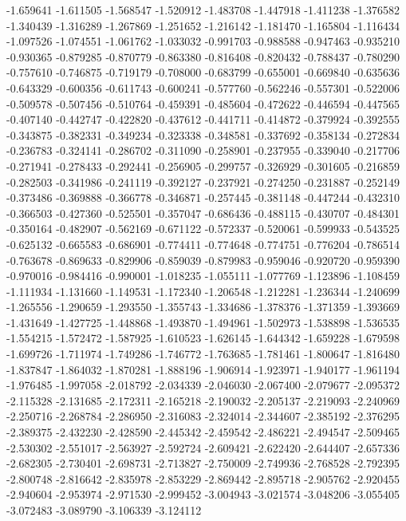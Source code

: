 -1.659641
-1.611505
-1.568547
-1.520912
-1.483708
-1.447918
-1.411238
-1.376582
-1.340439
-1.316289
-1.267869
-1.251652
-1.216142
-1.181470
-1.165804
-1.116434
-1.097526
-1.074551
-1.061762
-1.033032
-0.991703
-0.988588
-0.947463
-0.935210
-0.930365
-0.879285
-0.870779
-0.863380
-0.816408
-0.820432
-0.788437
-0.780290
-0.757610
-0.746875
-0.719179
-0.708000
-0.683799
-0.655001
-0.669840
-0.635636
-0.643329
-0.600356
-0.611743
-0.600241
-0.577760
-0.562246
-0.557301
-0.522006
-0.509578
-0.507456
-0.510764
-0.459391
-0.485604
-0.472622
-0.446594
-0.447565
-0.407140
-0.442747
-0.422820
-0.437612
-0.441711
-0.414872
-0.379924
-0.392555
-0.343875
-0.382331
-0.349234
-0.323338
-0.348581
-0.337692
-0.358134
-0.272834
-0.236783
-0.324141
-0.286702
-0.311090
-0.258901
-0.237955
-0.339040
-0.217706
-0.271941
-0.278433
-0.292441
-0.256905
-0.299757
-0.326929
-0.301605
-0.216859
-0.282503
-0.341986
-0.241119
-0.392127
-0.237921
-0.274250
-0.231887
-0.252149
-0.373486
-0.369888
-0.366778
-0.346871
-0.257445
-0.381148
-0.447244
-0.432310
-0.366503
-0.427360
-0.525501
-0.357047
-0.686436
-0.488115
-0.430707
-0.484301
-0.350164
-0.482907
-0.562169
-0.671122
-0.572337
-0.520061
-0.599933
-0.543525
-0.625132
-0.665583
-0.686901
-0.774411
-0.774648
-0.774751
-0.776204
-0.786514
-0.763678
-0.869633
-0.829906
-0.859039
-0.879983
-0.959046
-0.920720
-0.959390
-0.970016
-0.984416
-0.990001
-1.018235
-1.055111
-1.077769
-1.123896
-1.108459
-1.111934
-1.131660
-1.149531
-1.172340
-1.206548
-1.212281
-1.236344
-1.240699
-1.265556
-1.290659
-1.293550
-1.355743
-1.334686
-1.378376
-1.371359
-1.393669
-1.431649
-1.427725
-1.448868
-1.493870
-1.494961
-1.502973
-1.538898
-1.536535
-1.554215
-1.572472
-1.587925
-1.610523
-1.626145
-1.644342
-1.659228
-1.679598
-1.699726
-1.711974
-1.749286
-1.746772
-1.763685
-1.781461
-1.800647
-1.816480
-1.837847
-1.864032
-1.870281
-1.888196
-1.906914
-1.923971
-1.940177
-1.961194
-1.976485
-1.997058
-2.018792
-2.034339
-2.046030
-2.067400
-2.079677
-2.095372
-2.115328
-2.131685
-2.172311
-2.165218
-2.190032
-2.205137
-2.219093
-2.240969
-2.250716
-2.268784
-2.286950
-2.316083
-2.324014
-2.344607
-2.385192
-2.376295
-2.389375
-2.432230
-2.428590
-2.445342
-2.459542
-2.486221
-2.494547
-2.509465
-2.530302
-2.551017
-2.563927
-2.592724
-2.609421
-2.622420
-2.644407
-2.657336
-2.682305
-2.730401
-2.698731
-2.713827
-2.750009
-2.749936
-2.768528
-2.792395
-2.800748
-2.816642
-2.835978
-2.853229
-2.869442
-2.895718
-2.905762
-2.920455
-2.940604
-2.953974
-2.971530
-2.999452
-3.004943
-3.021574
-3.048206
-3.055405
-3.072483
-3.089790
-3.106339
-3.124112
